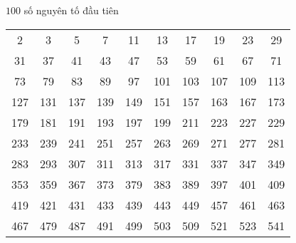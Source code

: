 \begin{frame}{$100$ số nguyên tố đầu tiên}
  \begin{center}
    \begin{tabular}[h]{cccccccccc}
      2& 3& 5& 7& 11& 13& 17& 19& 23& 29\\
      31& 37& 41& 43& 47& 53& 59& 61& 67 &71\\
      73& 79& 83& 89& 97& 101& 103& 107& 109 &113\\
      127& 131& 137& 139& 149& 151& 157& 163& 167 &173\\
      179& 181& 191& 193& 197& 199& 211& 223& 227 &229\\
      233& 239& 241& 251& 257& 263& 269& 271& 277 &281\\
      283& 293& 307& 311& 313& 317& 331& 337& 347 &349\\
      353& 359& 367& 373& 379& 383& 389& 397& 401 &409\\
      419& 421& 431& 433& 439& 443& 449& 457& 461 &463\\
      467& 479& 487& 491& 499& 503& 509& 521& 523 &541
                                                    

    \end{tabular}
  \end{center}
\end{frame}



